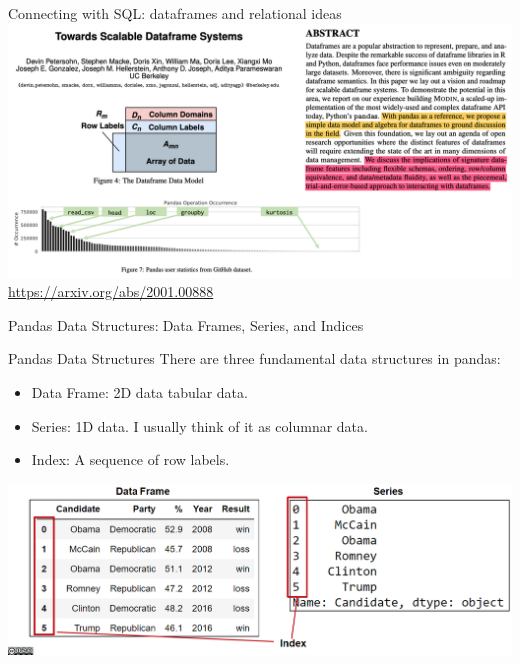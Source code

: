 \documentclass[aspectratio=169]{../latex_main/tntbeamer}  %
\begin{document}
	\begin{frame}{Connecting with SQL: dataframes and relational ideas}
	       \includegraphics[scale=.33]{Bild3}\\
	       \url{https://arxiv.org/abs/2001.00888}
	\end{frame}
	
	
	\begin{frame}{Pandas Data Structures:Data Frames, Series, and Indices}
	    
	\end{frame}
	
	
	\begin{frame}{Pandas Data Structures }
	   There are three fundamental data structures in pandas:
	    \begin{itemize}
	        \item Data Frame: 2D data tabular data.
	        \item Series: 1D data. I usually think of it as columnar data.
	        \item Index: A sequence of row labels.
	    \end{itemize}
	    \includegraphics[scale=.36]{Bild4}
	\end{frame}
	
\end{document}
